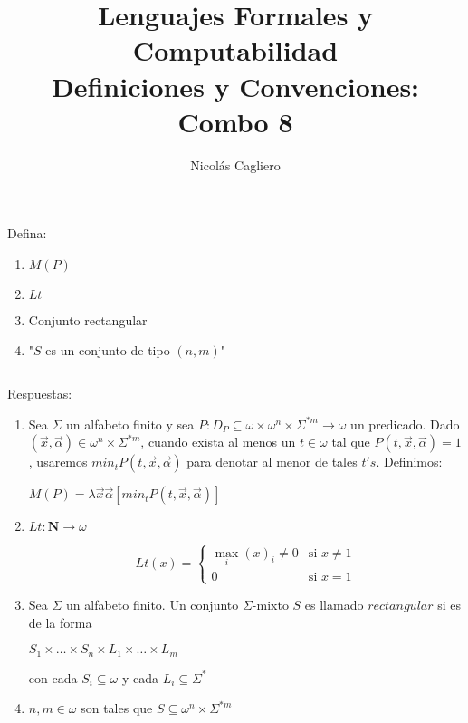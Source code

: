 \documentclass{article}
\title{Lenguajes Formales y Computabilidad \\
        \large Definiciones y Convenciones: Combo 8 }
\author{Nicolás Cagliero}
\begin{document}
\maketitle

Defina:

\begin{enumerate}
    \item $M(P)$

    \item $Lt$
    
    \item Conjunto rectangular
    
    \item "$S$ es un conjunto de tipo $(n, m)$"
\end{enumerate}

\(\)
\begin{center}
    Respuestas: 
    \(\)
\end{center}

\begin{enumerate}
    \item Sea $\Sigma$ un alfabeto finito y sea $P : D_P 
    \subseteq \omega \times \omega^{n} \times \Sigma^{*m} \rightarrow \omega$ un predicado.
    Dado $(\overset{\rightarrow}{x}, \overset{\rightarrow}{\alpha})
    \in \omega^n \times \Sigma^{*m}$, cuando exista al menos un $t \in \omega$ tal que
    $P(t, \overset{\rightarrow}{x}, \overset{\rightarrow}{\alpha}) = 1$, 
    usaremos $min_t P(t, \overset{\rightarrow}{x}, \overset{\rightarrow}{\alpha})$ para
    denotar al menor de tales $t's$. Definimos:
    \begin{center}
        $M(P) = \lambda\overset{\rightarrow}{x} \overset{\rightarrow}{\alpha}
        [min_t P(t, \overset{\rightarrow}{x}, \overset{\rightarrow}{\alpha})]$
    \end{center}

    \item $Lt : \mathbf{N} \rightarrow \omega$
    \begin{center}
        \[
            Lt(x) =
            \begin{cases}
            \max_i (x)_i \neq 0 & \text{si } x \neq 1 \\
            0 & \text{si } x = 1
            \end{cases}
        \]
    \end{center}

    \item Sea $\Sigma$ un alfabeto finito. Un conjunto $\Sigma$-mixto $S$ es llamado
    $rectangular$ si es de la forma 
    \begin{center}
        $S_1 \times \dots \times S_n \times L_1 \times \dots \times L_m$
    \end{center}
    con cada $S_i \subseteq \omega$ y cada $L_i \subseteq \Sigma^{*}$

    \item $n, m \in \omega$ son tales que 
    $S \subseteq \omega^n \times \Sigma^{*m}$
\end{enumerate}
\end{document}
